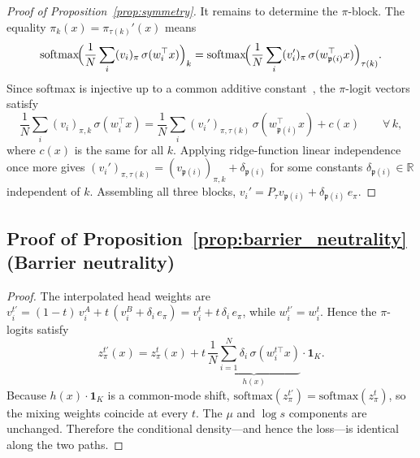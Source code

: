\documentclass[11pt]{article}
\newcommand{\R}{\mathbb{R}}
\newcommand{\nperm}{\mathfrak{p}}  %
\begin{document}
\begin{proof}[Proof of Proposition~\ref{prop:symmetry}]
It remains to determine the $\pi$-block.
The equality $\pi_k(x) = \pi_{\tau(k)}'(x)$ means
\[
  \mathrm{softmax}\!\Bigl(
    \frac{1}{N}\sum_i (v_i)_{\pi}\,\sigma(w_i^\top x)
  \Bigr)_k
  = \mathrm{softmax}\!\Bigl(
    \frac{1}{N}\sum_i (v_i')_{\pi}\,\sigma(w_{\nperm(i)}^\top x)
  \Bigr)_{\tau(k)}.
\]
Since softmax is injective up to a common additive
constant~\cite{luce1959}, the $\pi$-logit vectors satisfy
\[
  \frac{1}{N}\sum_i (v_i)_{\pi,k}\,\sigma(w_i^\top x)
  = \frac{1}{N}\sum_i (v_i')_{\pi,\tau(k)}\,\sigma(w_{\nperm(i)}^\top x)
  + c(x)
  \qquad \forall\,k,
\]
where $c(x)$ is the same for all $k$.
Applying ridge-function linear independence once more gives
$(v_i')_{\pi,\tau(k)} = (v_{\nperm(i)})_{\pi,k} + \delta_{\nperm(i)}$
for some constants $\delta_{\nperm(i)} \in \R$ independent of $k$.
Assembling all three blocks, $v_i' = P_\tau v_{\nperm(i)}
+ \delta_{\nperm(i)}\,e_\pi$.
\end{proof}

\subsection{Proof of Proposition~\ref{prop:barrier_neutrality}
  (Barrier neutrality)}\label{app:proof_neutrality}

\begin{proof}
The interpolated head weights are
$v_i^{t'} = (1-t)\,v_i^A + t\,(v_i^B + \delta_i\,e_\pi)
= v_i^t + t\,\delta_i\,e_\pi$,
while $w_i^{t'} = w_i^t$.
Hence the $\pi$-logits satisfy
\[
  z_\pi^{t'}(x)
  = z_\pi^t(x)
    + t\,\underbrace{\frac{1}{N}\sum_{i=1}^N
      \delta_i\,\sigma(w_i^{t\top} x)}_{h(x)}
    \cdot\mathbf{1}_K.
\]
Because $h(x)\cdot\mathbf{1}_K$ is a common-mode shift,
$\mathrm{softmax}(z_\pi^{t'}) = \mathrm{softmax}(z_\pi^t)$,
so the mixing weights coincide at every $t$.
The $\mu$ and $\log s$ components are unchanged.
Therefore the conditional density---and hence the loss---is identical
along the two paths.
\end{proof}
\end{document}
